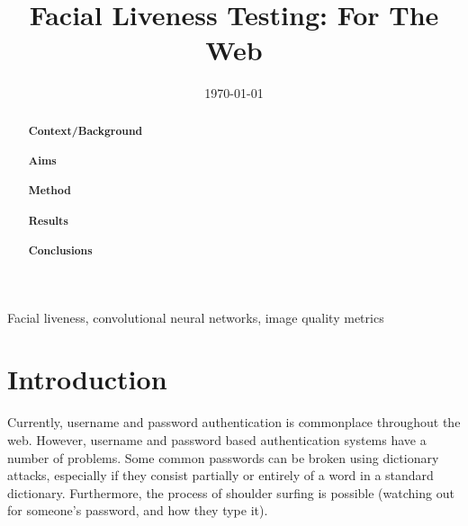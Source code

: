 \documentclass[10pt,a4paper]{article}
\title{Facial Liveness Testing: For The Web}
\author{} %
\date{\today}
\begin{document}
\maketitle

\begin{abstract}

\paragraph{Context/Background}

\paragraph{Aims}

\paragraph{Method}

\paragraph{Results}
\paragraph{Conclusions}

\end{abstract}

\begin{keywords}
Facial liveness, convolutional neural networks, image quality metrics
\end{keywords}

\section{Introduction}
    Currently, username and password authentication is commonplace throughout the web. However, username and password
    based authentication systems have a number of problems. Some common passwords can be broken using dictionary attacks,
    especially if they consist partially or entirely of a word in a standard dictionary. Furthermore, the process of shoulder surfing is possible (watching out
    for someone's password, and how they type it).
\end{document}
